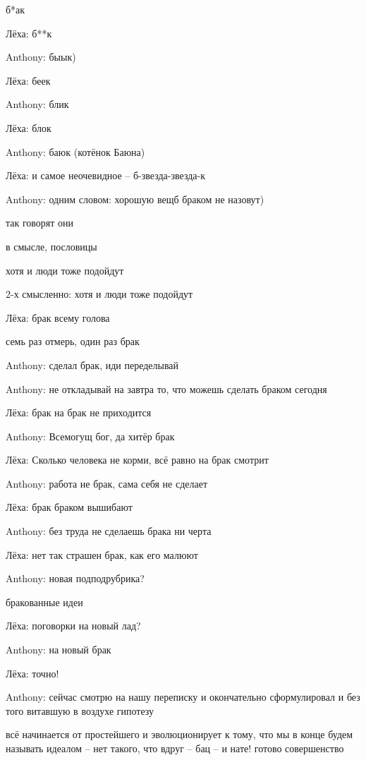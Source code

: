 \begin{flushleft}
\begin{miamalist}
  б*ак

  \item[Лёха:] б**к
  \item[Anthony:] быык)
  \item[Лёха:] беек
  \item[Anthony:] блик
  \item[Лёха:] блок
  \item[Anthony:] баюк (котёнок Баюна)
  \item[Лёха:] и самое неочевидное -- б-звезда-звезда-к
  \item[Anthony:] одним словом: хорошую вещб браком не назовут)

  так говорят они

  в смысле, пословицы

  хотя и люди тоже подойдут

  2-х смысленно: хотя и люди тоже подойдут
  \item[Лёха:] брак всему голова

  семь раз отмерь, один раз брак
  \item[Anthony:] сделал брак, иди переделывай
  \item[Anthony:] не откладывай на завтра то, что можешь сделать браком сегодня
  \item[Лёха:] брак на брак не приходится
  \item[Anthony:] Всемогущ бог, да хитёр брак
  \item[Лёха:] Сколько человека не корми, всё равно на брак смотрит
  \item[Anthony:] работа не брак, сама себя не сделает
  \item[Лёха:] брак браком вышибают
  \item[Anthony:] без труда не сделаешь брака ни черта
  \item[Лёха:] нет так страшен брак, как его малюют
  \item[Anthony:] новая подподрубрика?

  бракованные идеи
  \item[Лёха:] поговорки на новый лад?
  \item[Anthony:] на новый брак
  \item[Лёха:] точно!
  \item[Anthony:] сейчас смотрю на нашу переписку и окончательно сформулировал и без того витавшую в воздухе гипотезу

  всё начинается от простейшего и эволюционирует к тому, что мы в конце будем называть идеалом -- нет такого, что вдруг -- бац -- и нате! готово совершенство


\end{miamalist}
\end{flushleft}
